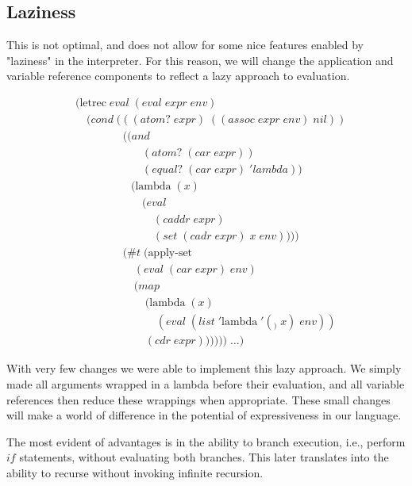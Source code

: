\subsection{Laziness}
This is not optimal, and does not allow for some nice features enabled by 
"laziness" in the interpreter. For this reason, we will change the 
application and variable reference components to reflect a lazy approach to 
evaluation.

\begin{figure}[ht]
\caption{}\label{scheme}
\begin{align*}
& (\text{letrec} \; eval \; (eval \; expr \; env)
\\& \quad (cond \; (((atom? \; expr) \; ((assoc \; expr \; env) \; nil))
\\& \qquad \qquad \; ((and \; 
\\& \qquad \qquad \qquad (atom? \; (car \; expr)) \; 
\\& \qquad \qquad \qquad (equal? \; (car \; expr) \; 'lambda)) \; 
\\& \qquad \qquad \quad (\text{lambda} \; (x) \; 
\\& \qquad \qquad \qquad (eval \; 
\\& \qquad \qquad \qquad \quad (caddr \; expr) \; 
\\& \qquad \qquad \qquad \quad (set \; (cadr \; expr) \; x \; env))))
\\& \qquad \qquad \; (\#t \; (\text{apply-set} \; 
\\& \qquad \qquad \quad \; (eval \; (car \; expr) \; env) \; 
\\& \qquad \qquad \quad \; (map \; 
\\& \qquad \qquad \qquad \; (\text{lambda} \; (x) \; 
\\& \qquad \qquad \qquad \quad \; (eval \; (list \; '\text{lambda} \; '(_) \; x) \; env)) \; 
\\& \qquad \qquad \qquad \; (cdr \; expr)))))) \; \dots)
\end{align*}
\end{figure}

With very few changes we were able to implement this lazy approach. We simply 
made all arguments wrapped in a lambda before their evaluation, and all 
variable references then reduce these wrappings when appropriate. These small 
changes will make a world of difference in the potential of expressiveness in 
our language.

The most evident of advantages is in the ability to branch execution, i.e., 
perform $if$ statements, without evaluating both branches. This later 
translates into the ability to recurse without invoking infinite recursion.

